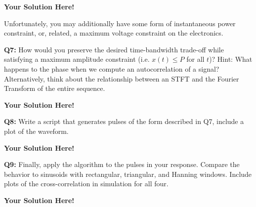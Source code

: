\documentclass[12pt]{article}
\newcommand{\0}{\mathbf{0}}
\newcommand{\1}{\mathbf{1}}
\newcommand{\solspace}{\vspace{3mm} \textbf{Your Solution Here!} \vspace{3mm}}
\begin{document}
\solspace

Unfortunately, you may additionally have some form of instantaneous power constraint, or, related, a maximum voltage constraint on the electronics.

\textbf{Q7: } How would you preserve the desired time-bandwidth trade-off while satisfying a maximum amplitude constraint (i.e. $x(t) \leq P$ for all $t$)? Hint: What happens to the phase when we compute an autocorrelation of a signal? Alternatively, think about the relationship between an STFT and the Fourier Transform of the entire sequence. 

\solspace

\textbf{Q8: } Write a script that generates pulses of the form described in Q7, include a plot of the waveform.

\solspace

\textbf{Q9: } Finally, apply the algorithm to the pulses in your response. Compare the behavior to sinusoids with rectangular, triangular, and Hanning windows.
Include plots of the cross-correlation in simulation for all four.

\solspace


\pagebreak
%
%
\end{document}
